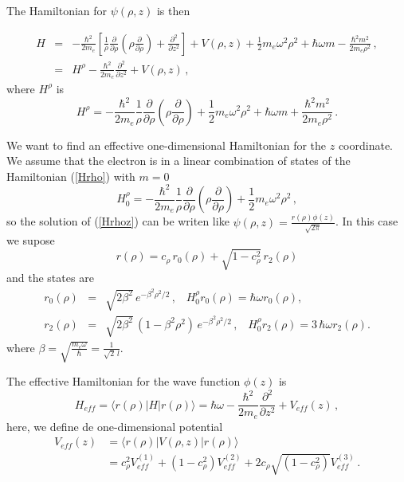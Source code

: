 \documentclass[a4paper,10pt]{article}
\begin{document}
The Hamiltonian for $\psi(\rho,z)$ is then

\begin{eqnarray}\label{Hrhoz}
H &=& -\frac{\hbar^2}{2 m_e}\left[\frac{1}{\rho}\frac{\partial}{\partial \rho}\left(\rho \frac{\partial}{\partial \rho} \right)
 + \frac{\partial^2}{\partial z^2} \right] + V(\rho, z) + \frac{1}{2} m_e \omega^2 \rho^2 + \hbar \omega m - \frac{\hbar^2 m^2}{2 m_e \rho^2}\,,\\
  &=& H^{\rho} - \frac{\hbar^2}{2 m_e}\frac{\partial^2}{\partial z^2} + V(\rho, z)\, ,
\end{eqnarray}
\noindent
where $H^{\rho}$ is
\begin{equation}\label{Hrho}
  H^{\rho} = -\frac{\hbar^2}{2 m_e} \frac{1}{\rho}\frac{\partial}{\partial \rho}\left(\rho \frac{\partial}{\partial \rho} \right) +
  \frac{1}{2} m_e \omega^2 \rho^2 + \hbar \omega m + \frac{\hbar^2 m^2}{2 m_e \rho^2}\,.
\end{equation}

We want to find an effective one-dimensional Hamiltonian for the $z$ coordinate. We assume that
the electron is in a linear combination of states of the Hamiltonian (\ref{Hrho}) with $m = 0$
\begin{equation}
  H_{0}^{\rho} = -\frac{\hbar^2}{2 m_e} \frac{1}{\rho}\frac{\partial}{\partial \rho}\left(\rho \frac{\partial}{\partial \rho} \right) +
  \frac{1}{2} m_e \omega^2 \rho^2 \, ,
\end{equation}
\noindent so the solution of (\ref{Hrhoz})
can be writen like $\psi(\rho, z) = \frac{r(\rho)\phi(z)}{\sqrt{2\pi}}$. In this case we supose
\begin{equation}
  r(\rho) = c_{\rho}\, r_0(\rho) + \sqrt{1 - c_{\rho}^2}\, r_2(\rho)
\end{equation}
\noindent and the states are
\begin{eqnarray}
  r_0(\rho) &=& \sqrt{2 \beta^2}\, e^{-\beta^2 \rho^2/2}\,,\,\,\,\,\,H_{0}^{\rho} r_0(\rho) = \hbar \omega r_0(\rho) ,\\
  r_2(\rho) &=& \sqrt{2 \beta^2}\, \left(1 - \beta^2 \rho^2 \right)\, e^{-\beta^2 \rho^2/2}\,,\,\,\,\,\,H_{0}^{\rho} r_2(\rho) = 3\,\hbar \omega r_2(\rho).
\end{eqnarray}
\noindent where $\beta = \sqrt{\frac{m_e \omega}{\hbar}} = \frac{1}{\sqrt{2}\,l}$.

The effective Hamiltonian for the wave function $\phi(z)$ is
\begin{equation}
  H_{eff} = \langle r(\rho)|H|r(\rho)\rangle = \hbar \omega - \frac{\hbar^2}{2 m_e}\frac{\partial^2}{\partial z^2} + V_{eff}(z)\,,
\end{equation}
\noindent here, we define de one-dimensional potential
\begin{equation}\label{1e_V_eff}
  \begin{split}
  V_{eff}(z) &= \langle r(\rho)|V(\rho,z)|r(\rho)\rangle \\
             &= c_{\rho}^2 V_{eff}^{(1)} + (1-c_{\rho}^2) V_{eff}^{(2)} + 2c_{\rho}\sqrt{(1-c_{\rho}^2)} V_{eff}^{(3)}\,.
  \end{split}
\end{equation}
\end{document}
